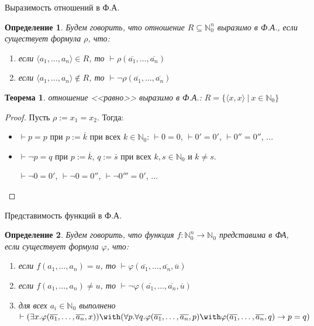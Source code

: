 \documentclass[aspectratio=169]{beamer}
\newtheorem{thm}{Теорема}[section]
\newtheorem{dfn}{Определение}[section]
\begin{document}
\begin{frame}{Выразимость отношений в Ф.А.}
\begin{dfn}
Будем говорить, что отношение $R\subseteq \mathbb{N}^n_0$ выразимо в Ф.А., 
если существует формула $\rho$, что:
\begin{enumerate}
\item если $\langle a_1,\dots,a_n \rangle \in R$, то $\vdash \rho(\overline{a_1},\dots,\overline{a_n})$
\item если $\langle a_1,\dots,a_n \rangle \notin R$, то $\vdash \neg\rho(\overline{a_1},\dots,\overline{a_n})$
\end{enumerate}
\end{dfn}\pause

\begin{thm} отношение <<равно>> выразимо в Ф.А.:
$R = \{ \langle x,x \rangle\ |\ x \in \mathbb{N}_0 \}$
\end{thm}\pause

\begin{proof}
Пусть $\rho := x_1=x_2$. \pause Тогда:
\begin{itemize}
\item $\vdash p = p$ при $p := \overline{k}$ при всех $k \in \mathbb{N}_0$: \pause $\vdash 0=0$, $\vdash 0'=0'$, $\vdash 0''=0''$, ... \pause
\item $\vdash \neg p = q$ при $p := \overline{k}$, $q := \overline{s}$ при всех $k,s \in \mathbb{N}_0$ и $k \ne s$.

\pause $\vdash \neg 0 = 0'$, $\vdash \neg 0 = 0''$, $\vdash \neg 0''' = 0'$, ...
\end{itemize}
\end{proof}

\end{frame}

\begin{frame}{Представимость функций в Ф.А.}
\begin{dfn}
Будем говорить, что функция $f: \mathbb{N}^n_0\to\mathbb{N}_0$ представима в ФА, 
если существует формула $\varphi$, что:
\begin{enumerate}
\item если $f(a_1,\dots,a_n) = u$, то $\vdash \varphi(\overline{a_1},\dots,\overline{a_n},\overline{u})$
\item если $f(a_1,\dots,a_n) \ne u$, то $\vdash \neg\varphi(\overline{a_1},\dots,\overline{a_n},\overline{u})$
\item для всех $a_i \in \mathbb{N}_0$ выполнено $\vdash (\exists x.\varphi(\overline{a_1},\dots,\overline{a_n},x)) \with 
   (\forall p.\forall q.\varphi(\overline{a_1},\dots,\overline{a_n},p)\with \varphi(\overline{a_1},\dots,\overline{a_n},q)\rightarrow p=q)$
\end{enumerate}
\end{dfn}
\end{frame}
\end{document}
